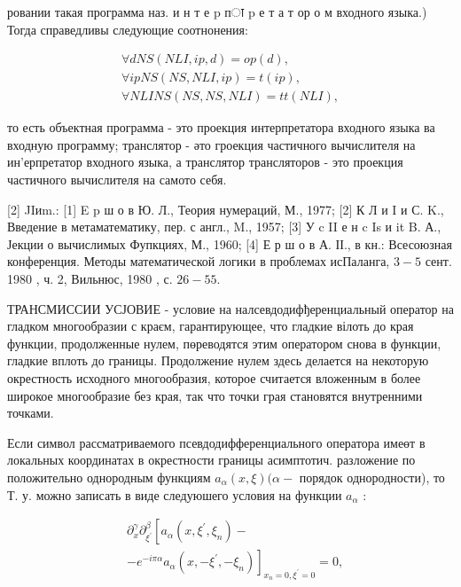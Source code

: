 \documentclass[10pt]{article}
\begin{document}
ровании такая программа наз. и н т е $\mathrm{p}$ пा $\mathrm{p}$ е т а т ор о м входного языка.) Тогда справедливы следующие соотнонения:



\[

\begin{gathered}

\forall d N S(N L I, i p, d)=o p(d), \\

\forall i p N S(N S, N L I, i p)=t(i p), \\

\forall N L I N S(N S, N S, N L I)=t t(N L I),

\end{gathered}

\]



то есть объектная программа - это проекция интерпретатора входного языка ва входную программу; транслятор - әто гроекция частичного вычислителя на ин'ерпретатор входного языка, а транслятор трансляторов - это проекция частичного вычислителя на самото себя.



[2] JIиm.: [1] E p ш о в Ю. Л., Теория нумераций, М., 1977; [2] К Л и I и С. K., Введение в метаматематику, пер. с англ., M., 1957; [3] У c II е н c Is и it B. А., Јекции о вычислимых Фупкциях, М., 1960; [4] Е р ш о в А. ІІ., в кн.: Всесоюзная конференция. Методы математической логики в проблемах исПаланга, $3-5$ сент. 1980 , ч. 2, Вильнюс, 1980 , с. $26-55$.



ТРАНСМИССИИ УСЈОВИЕ - условие на налсевдодифђеренциальный оператор на гладком многообразии с краєм, гарантирующее, что гладкие вілоть до края функции, продолженные нулем, пөреводятся этим оператором снова в функции, гладкие вплоть до границы. Продолжение нулем здесь делается на некоторую окрестность исходного многообразия, которое считается вложенным в более широкое многообразие без края, так что точки грая становятся внутренними точками.



Если символ рассматриваемого псевдодифференциального оператора имеөт в локальных координатах в окрестности границы асимптотич. разложение по положительно однородным функциям $a_{\alpha}(x, \xi)(\alpha-$ порядок однородности), то Т. у. можно записать в виде следуюшего условия на функции $a_{\alpha}$ :



\[

\begin{aligned}

& \partial_{x}^{\gamma} \partial_{\xi^{\prime}}^{\beta}\left[a_{\alpha}\left(x, \xi^{\prime}, \xi_{n}\right)-\right. \\

& \left.-e^{-i \pi \alpha} a_{\alpha}\left(x,-\xi^{\prime},-\xi_{n}\right)\right]_{x_{n}=0, \xi^{\prime}=0}=0,

\end{aligned}

\]
\end{document}
